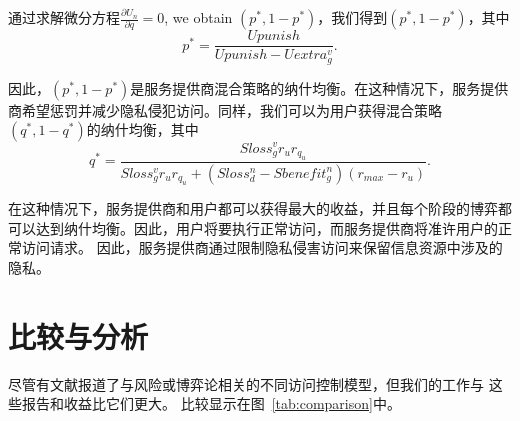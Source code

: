 通过求解微分方程$\frac{\partial U_n}{\partial q}=0$, we obtain $(p^*,1-p^*)$，我们得到$(p^*,1-p^*)$，其中
\begin{equation}
p^*=\dfrac{Upunish}{Upunish-Uextra_g^v}.
\end{equation}

因此，$(p^*,1-p^*)$是服务提供商混合策略的纳什均衡。在这种情况下，服务提供商希望惩罚并减少隐私侵犯访问。同样，我们可以为用户获得混合策略$(q^*,1-q^*)$的纳什均衡，其中
\begin{equation}
q^*=\dfrac{Sloss_g^v r_u r_{q_u}}{Sloss_g^v r_u  r_{q_u} +(Sloss_d^n -Sbenefit_g^n)(r_{max}-r_u)}.
\end{equation}

在这种情况下，服务提供商和用户都可以获得最大的收益，并且每个阶段的博弈都可以达到纳什均衡。因此，用户将要执行正常访问，而服务提供商将准许用户的正常访问请求。 因此，服务提供商通过限制隐私侵害访问来保留信息资源中涉及的隐私。

\section{比较与分析}
\label{sec:comparison}

尽管有文献\cite{ni2010risk,wang2011quantified,shaikh2012dynamic,santos2016,wang2019,zhang2015,zhen2015,zhang2018privacy,gao2018,liu2016,helil2017,hu2014,ding2019}报道了与风险或博弈论相关的不同访问控制模型，但我们的工作与 这些报告和收益比它们更大。 比较显示在图~\ref{tab:comparison}中。


